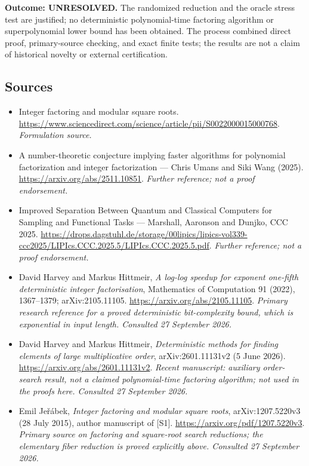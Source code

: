 \documentclass[11pt]{article}
\begin{document}
\textbf{Outcome: UNRESOLVED.} The randomized reduction and the oracle
stress test are justified; no deterministic polynomial-time factoring
algorithm or superpolynomial lower bound has been obtained. The process
combined direct proof, primary-source checking, and exact finite tests;
the results are not a claim of historical novelty or external certification.

\subsection{Sources}
\begin{itemize}
\item[S1]Integer factoring and modular square roots.
\url{https://www.sciencedirect.com/science/article/pii/S0022000015000768}.
\textit{Formulation source.}
\item[S2]A number-theoretic conjecture implying faster algorithms for polynomial factorization and integer factorization — Chris Umans and Siki Wang (2025).
\url{https://arxiv.org/abs/2511.10851}.
\textit{Further reference; not a proof endorsement.}
\item[S3]Improved Separation Between Quantum and Classical Computers for Sampling and Functional Tasks — Marshall, Aaronson and Dunjko, CCC 2025.
\url{https://drops.dagstuhl.de/storage/00lipics/lipics-vol339-ccc2025/LIPIcs.CCC.2025.5/LIPIcs.CCC.2025.5.pdf}.
\textit{Further reference; not a proof endorsement.}

\item[E1]David Harvey and Markus Hittmeir,
\emph{A log-log speedup for exponent one-fifth deterministic integer
factorisation}, Mathematics of Computation 91 (2022), 1367--1379;
arXiv:2105.11105.
\url{https://arxiv.org/abs/2105.11105}.
\textit{Primary research reference for a proved deterministic bit-complexity
bound, which is exponential in input length. Consulted 27 September 2026.}
\item[E2]David Harvey and Markus Hittmeir,
\emph{Deterministic methods for finding elements of large multiplicative order},
arXiv:2601.11131v2 (5 June 2026).
\url{https://arxiv.org/abs/2601.11131v2}.
\textit{Recent manuscript: auxiliary order-search result, not a claimed
polynomial-time factoring algorithm; not used in the proofs here.
Consulted 27 September 2026.}
\item[E3]Emil Je\v r\'abek, \emph{Integer factoring and modular square roots},
arXiv:1207.5220v3 (28 July 2015), author manuscript of [S1].
\url{https://arxiv.org/pdf/1207.5220v3}.
\textit{Primary source on factoring and square-root search reductions;
the elementary fiber reduction is proved explicitly above.
Consulted 27 September 2026.}
\end{itemize}
\end{document}
